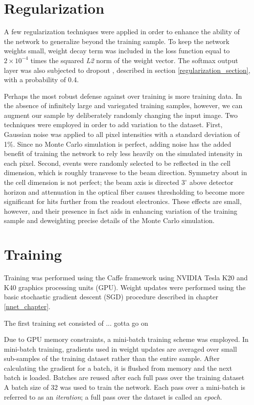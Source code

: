 \clearpage

\section{Regularization}

A few regularization techniques were applied in order to enhance the ability
of the network to generalize beyond the training sample.
To keep the network weights small, weight decay term was included in the loss
function equal to $2\times 10^{-4}$ times the squared \textit{L2} norm of the
weight vector.
The softmax output layer was also subjected to dropout
\cite{hinton2014dropout}, described in section \ref{regularization_section},
with a probability of 0.4.

Perhaps the most robust defense against over training is more training
data.
In the absence of infinitely large and variegated training samples, however,
we can augment our sample by deliberately randomly changing the input image.
Two techniques were employed in order to add variation to the dataset.
First, Gaussian noise was applied to all pixel intensities with
a standard deviation of 1\%.
Since no Monte Carlo simulation is perfect, adding noise has the added benefit
of training the network to rely less heavily on the simulated intensity
in each pixel.
Second, events were randomly selected to be reflected in the cell dimension,
which is roughly transvese to the beam direction.
Symmetry about in the cell dimension is not perfect; the beam axis is directed
$3^{\circ}$ above detector horizon and attenuation in the optical fiber
causes thresholding to become more significant for hits further from
the readout electronics.
These effects are small, however, and their presence in fact aids in
enhancing variation of the training sample and deweighting precise details
of the Monte Carlo simulation.


\section{Training}

Training was performed using the Caffe framework \cite{jia2014caffe}
using NVIDIA Tesla K20 and K40 graphics processing units (GPU).
Weight updates were
performed using the basic stochastic gradient descent (SGD)
\cite{reed1999neural} procedure described in chapter \ref{nnet_chapter}.

The first training set consisted of ... gotta go on

Due to GPU memory constraints, a mini-batch training scheme was employed.
In mini-batch training, gradients used in weight updates are averaged over
small sub-samples of the training dataset rather than the entire sample.
After calculating the gradient for a batch, it is flushed from memory
and the next batch is loaded.
Batches are reused after each full pass over the training dataset
A batch size of 32 was used to train the network.
Each pass over a mini-batch is referred to as an \textit{iteration};
a full pass over the dataset is called an \textit{epoch}.

